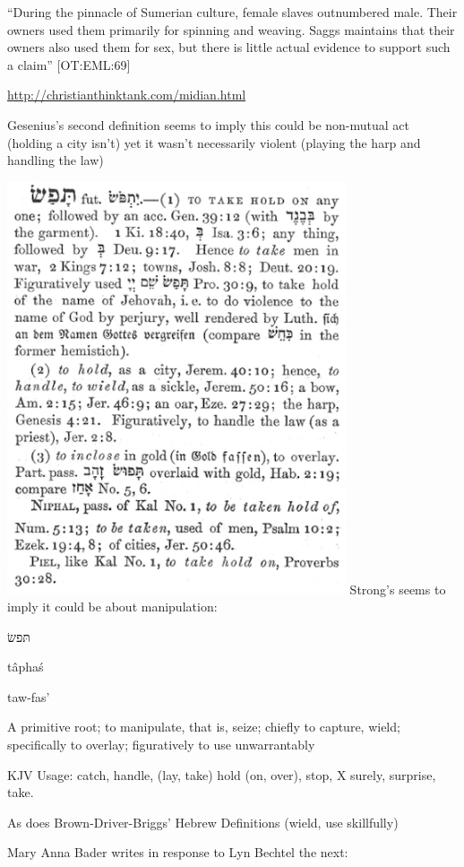 \documentclass[11pt]{article}
\begin{document}
{“During the pinnacle of Sumerian culture, female slaves outnumbered male. Their owners used them primarily for spinning and weaving. Saggs maintains that their owners also used them for sex, but there is little actual evidence to support such a claim” [OT:EML:69]

\url{http://christianthinktank.com/midian.html}


Gesenius’s second definition seems to imply this could be non-mutual act (holding a city isn’t) yet it wasn’t necessarily violent (playing the harp and handling the law)

\includegraphics[width=10cm]{taphas}
Strong’s seems to imply it could be about manipulation:

 \begin{hebrew} תּפשׂ  \end{hebrew}

tâphaś 

taw-fas' 

A primitive root; to manipulate, that is, seize; chiefly to capture, wield; specifically to overlay; figuratively to use unwarrantably

KJV Usage: catch, handle, (lay, take) hold (on, over), stop, X surely, surprise, take.


As does Brown-Driver-Briggs' Hebrew Definitions (wield, use skillfully)


Mary Anna Bader writes in response to Lyn Bechtel the next:

}
\end{document}
